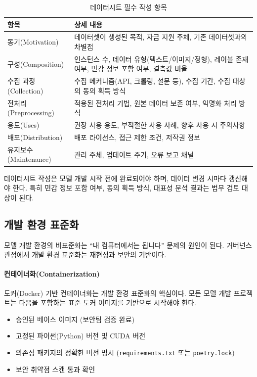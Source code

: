 \begin{table}[htbp]
\centering
\caption{데이터시트 필수 작성 항목}
\label{tab:datasheet_requirements}
\begin{tabularx}{\textwidth}{p{3cm}X}
\toprule
\textbf{항목} & \textbf{상세 내용} \\
\midrule
동기(Motivation) & 데이터셋이 생성된 목적, 자금 지원 주체, 기존 데이터셋과의 차별점 \\
\midrule
구성(Composition) & 인스턴스 수, 데이터 유형(텍스트/이미지/정형), 레이블 존재 여부, 민감 정보 포함 여부, 결측값 비율 \\
\midrule
수집 과정(Collection) & 수집 메커니즘(API, 크롤링, 설문 등), 수집 기간, 수집 대상의 동의 획득 방식 \\
\midrule
전처리(Preprocessing) & 적용된 전처리 기법, 원본 데이터 보존 여부, 익명화 처리 방식 \\
\midrule
용도(Uses) & 권장 사용 용도, 부적절한 사용 사례, 향후 사용 시 주의사항 \\
\midrule
배포(Distribution) & 배포 라이선스, 접근 제한 조건, 저작권 정보 \\
\midrule
유지보수(Maintenance) & 관리 주체, 업데이트 주기, 오류 보고 채널 \\
\bottomrule
\end{tabularx}
\end{table}

데이터시트 작성은 모델 개발 시작 전에 완료되어야 하며, 데이터 변경 시마다 갱신해야 한다. 특히 민감 정보 포함 여부, 동의 획득 방식, 대표성 분석 결과는 법무 검토 대상이 된다.

\subsection{개발 환경 표준화}
\label{sec:10.1.4}

모델 개발 환경의 비표준화는 ``내 컴퓨터에서는 됩니다'' 문제의 원인이 된다. 거버넌스 관점에서 개발 환경 표준화는 재현성과 보안의 기반이다.

\paragraph{컨테이너화(Containerization)}
도커(Docker) 기반 컨테이너화는 개발 환경 표준화의 핵심이다. 모든 모델 개발 프로젝트는 다음을 포함하는 표준 도커 이미지를 기반으로 시작해야 한다.

\begin{itemize}
  \item 승인된 베이스 이미지 (보안팀 검증 완료)
  \item 고정된 파이썬(Python) 버전 및 CUDA 버전
  \item 의존성 패키지의 정확한 버전 명시 (\texttt{requirements.txt} 또는 \texttt{poetry.lock})
  \item 보안 취약점 스캔 통과 확인
\end{itemize}

